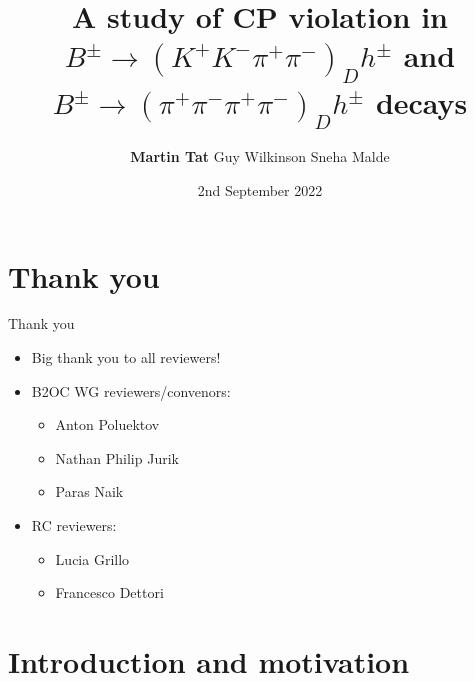 \documentclass{beamer}
\title[$B^\pm\to(K^+K^-\pi^+\pi^-)_Dh^\pm$]{A study of CP violation in \texorpdfstring{$B^\pm\to(K^+K^-\pi^+\pi^-)_Dh^\pm$}{B to K+K-pi+pi-} and \texorpdfstring{$B^\pm\to(\pi^+\pi^-\pi^+\pi^-)_Dh^\pm$}{B to K+K-pi+pi-} decays}
\author{\textbf{Martin Tat} \hspace{0.54em} Guy Wilkinson \hspace{0.54em} Sneha Malde}
\institute{\normalsize University of Oxford \\ \vspace{0.3cm} \normalsize Approval presentation \vspace{-0.2cm}}
\date{2nd September 2022}
\begin{document}
\begin{frame}
  \titlepage
\end{frame}


\section{Thank you}

\begin{frame}{Thank you}
  \begin{itemize}
    \setlength\itemsep{2.0em}
    \item{Big thank you to all reviewers!}
    \item{B2OC WG reviewers/convenors:}
    \begin{itemize}
      \item{Anton Poluektov}
      \item{Nathan Philip Jurik}
      \item{Paras Naik}
    \end{itemize}
    \item{RC reviewers:}
    \begin{itemize}
      \item{Lucia Grillo}
      \item{Francesco Dettori}
    \end{itemize}
  \end{itemize}
\end{frame}

\section{Introduction and motivation}
\end{document}
